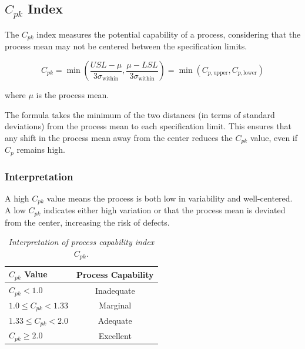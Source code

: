 \documentclass[twoside]{book}
\begin{document}
\subsection{$C_{pk}$ Index}

The $C_{pk}$ index measures the potential capability of a process, considering that the process mean may not be centered between the specification limits.

\begin{textbox}
$$C_{pk} = \min\left(\frac{USL - \mu}{3\sigma_{\text{within}}}, \frac{\mu - LSL}{3\sigma_{\text{within}}}\right)=\min \left(C_{p, \text{upper}}, C_{p, \text{lower}}\right)$$
\end{textbox}

where $\mu$ is the process mean.

The formula takes the minimum of the two distances (in terms of standard deviations) from the process mean to each specification limit. This ensures that any shift in the process mean away from the center reduces the $C_{pk}$ value, even if $C_{p}$ remains high.

\subsubsection{Interpretation}

A high $C_{pk}$ value means the process is both low in variability and well-centered. A low $C_{pk}$ indicates either high variation or that the process mean is deviated from the center, increasing the risk of defects.

\begin{table}[H]
\centering
\begin{tabular}{l|c}
\toprule
\textbf{$C_{pk}$ Value} & \textbf{Process Capability} \\
\midrule
$C_{pk} < 1.0$ & Inadequate \\
$1.0 \leq C_{pk} < 1.33$ & Marginal \\
$1.33 \leq C_{pk} < 2.0$ & Adequate \\
$C_{pk} \geq 2.0$ & Excellent \\
\bottomrule
\end{tabular}
\caption{\textit{Interpretation of process capability index $C_{pk}$.}}
\end{table}
\end{document}
